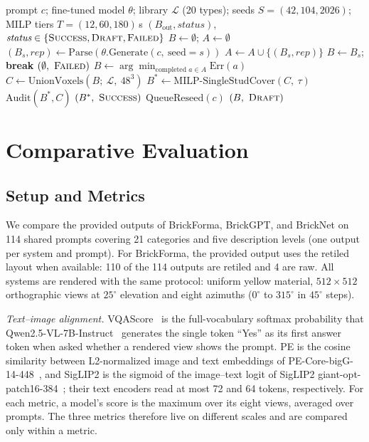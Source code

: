 \documentclass[letterpaper]{article} %
\begin{document}
\begin{algorithm}[t]
\caption{BrickForma inference and retiling}
\label{alg:inference-retiling}
\small
\begin{algorithmic}[1]
\REQUIRE prompt $c$; fine-tuned model $\theta$; library $\mathcal{L}$ (20 types); seeds $S=(42,104,2026)$; MILP tiers $T=(12,60,180)$\,s
\ENSURE $(B_{\mathrm{out}}, \textit{status})$, $\textit{status}\in\{\textsc{Success},\textsc{Draft},\textsc{Failed}\}$
\STATE $B \gets \emptyset$; $A \gets \emptyset$
  \STATE $(B_s,\textit{rep}) \gets \mathrm{Parse}(\theta.\mathrm{Generate}(c,\ \mathrm{seed}{=}s))$
  \STATE $A \gets A \cup \{(B_s,\textit{rep})\}$
    \STATE $B \gets B_s$; \textbf{break}
  \ENDIF
\ENDFOR
{}
    \RETURN $(\emptyset,\ \textsc{Failed})$
  \ENDIF
  \STATE $B \gets \arg\min_{\text{completed } a\in A} \mathrm{Err}(a)$
\ENDIF
\STATE $C \gets \mathrm{UnionVoxels}(B;\ \mathcal{L},\ 48^3)$ 
  \STATE $B^{*} \gets \mathrm{MILP\text{-}SingleStudCover}(C,\ \tau)$
    \STATE $\mathrm{Audit}(B^{*},C)$ 
    \RETURN $(B^{*},\ \textsc{Success})$
  \ENDIF
\ENDFOR
\STATE $\mathrm{QueueReseed}(c)$
\RETURN $(B,\ \textsc{Draft})$ 
\end{algorithmic}
\end{algorithm}

\section{Comparative Evaluation}
\label{sec:eval}
\subsection{Setup and Metrics}
\label{sec:setup}
We compare the provided outputs of BrickForma, BrickGPT, and BrickNet on 114 shared prompts covering 21 categories and five description levels (one output per system and prompt). For BrickForma, the provided output uses the retiled layout when available: 110 of the 114 outputs are retiled and 4 are raw. All systems are rendered with the same protocol: uniform yellow material, $512{\times}512$ orthographic views at $25^{\circ}$ elevation and eight azimuths ($0^{\circ}$ to $315^{\circ}$ in $45^{\circ}$ steps).

\emph{Text--image alignment.} VQAScore~\cite{vqascore} is the full-vocabulary softmax probability that Qwen2.5-VL-7B-Instruct~\cite{qwen25vl} generates the single token ``Yes'' as its first answer token when asked whether a rendered view shows the prompt. PE is the cosine similarity between L2-normalized image and text embeddings of PE-Core-bigG-14-448~\cite{pe}, and SigLIP2 is the sigmoid of the image--text logit of SigLIP2 giant-opt-patch16-384~\cite{siglip2}; their text encoders read at most 72 and 64 tokens, respectively. For each metric, a model's score is the maximum over its eight views, averaged over prompts. The three metrics therefore live on different scales and are compared only within a metric.
\end{document}
